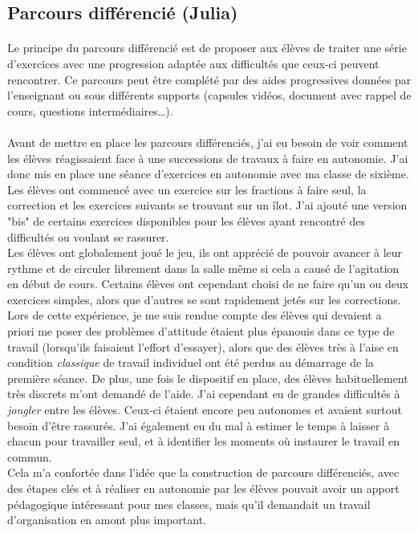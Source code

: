 \subsection{Parcours différencié (Julia)}

\paragraph{}
Le principe du parcours différencié est de proposer aux élèves de traiter une série d'exercices avec une progression adaptée aux difficultés que ceux-ci peuvent rencontrer. Ce parcours peut être complété par des aides progressives données par l'enseignant ou sous différents supports (capsules vidéos, document avec rappel de cours, questions intermédiaires\ldots ).
\paragraph{}
Avant de mettre en place les parcours différenciés, j'ai eu besoin de voir comment les élèves réagissaient face à une successions de travaux à faire en autonomie. J'ai donc mis en place une séance d'exercices en autonomie avec ma classe de sixième. \\
Les élèves ont commencé avec un exercice sur les fractions à faire seul, la correction et les exercices suivants se trouvant sur un îlot. J'ai ajouté une version "bis" de certains exercices disponibles pour les élèves ayant rencontré des difficultés ou voulant se rassurer. \\
Les élèves ont globalement joué le jeu, ils ont apprécié de pouvoir avancer à leur  rythme et de circuler librement dans la salle même si cela a causé de l'agitation en début de cours. Certains élèves ont cependant choisi de ne faire qu'un ou deux exercices simples, alors que d'autres se sont rapidement jetés sur les corrections.\\
\newline
Lors de cette expérience, je me suis rendue compte des élèves qui devaient a priori me poser des problèmes d'attitude étaient plus épanouis dans ce type de travail (lorsqu'ils faisaient l'effort d'essayer), alors que des élèves très à l'aise en condition \emph{classique} de travail individuel ont été perdus au démarrage de la première séance. De plus, une fois le dispositif en place, des élèves habituellement très discrets m'ont demandé de l'aide. J'ai cependant eu de grandes difficultés à \emph{jongler} entre les élèves. Ceux-ci étaient encore peu autonomes et avaient surtout besoin d'être rassurés. J'ai également eu du mal à estimer le temps à laisser à chacun pour travailler seul, et à identifier les moments où instaurer le travail en commun.\\
Cela m'a confortée dans l'idée que la construction de parcours différenciés, avec des étapes clés et à réaliser en autonomie par les élèves pouvait avoir un apport pédagogique intéressant pour mes classes, mais qu'il demandait un travail d'organisation en amont plus important.


